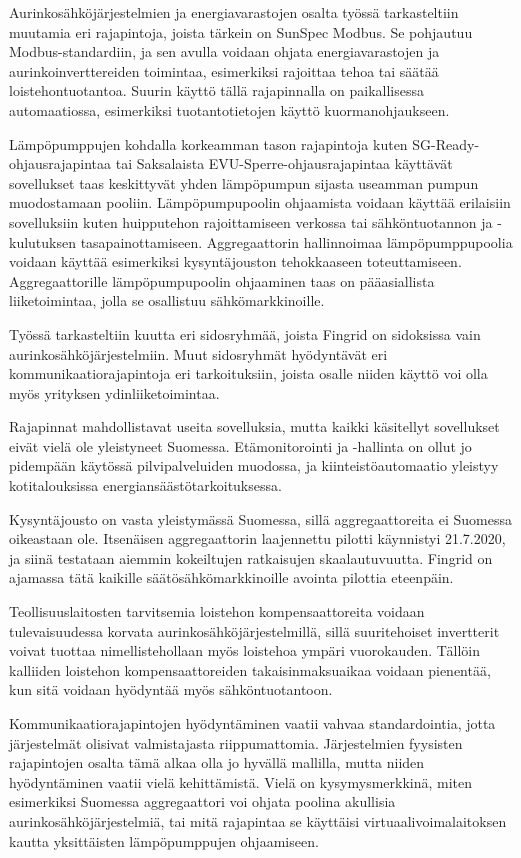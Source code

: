 Aurinkosähköjärjestelmien ja energiavarastojen osalta työssä tarkasteltiin muutamia eri rajapintoja, joista tärkein on SunSpec Modbus. Se pohjautuu Modbus-standardiin, ja sen avulla voidaan ohjata energiavarastojen ja aurinkoinverttereiden toimintaa, esimerkiksi rajoittaa tehoa tai säätää loistehontuotantoa. Suurin käyttö tällä rajapinnalla on paikallisessa automaatiossa, esimerkiksi tuotantotietojen käyttö kuormanohjaukseen.

Lämpöpumppujen kohdalla korkeamman tason rajapintoja kuten SG-Ready-ohjausrajapintaa tai Saksalaista EVU-Sperre-ohjausrajapintaa käyttävät sovellukset taas keskittyvät yhden lämpöpumpun sijasta useamman pumpun muodostamaan pooliin. Lämpöpumpupoolin ohjaamista voidaan käyttää erilaisiin sovelluksiin kuten huipputehon rajoittamiseen verkossa tai sähköntuotannon ja -kulutuksen tasapainottamiseen. Aggregaattorin hallinnoimaa lämpöpumppupoolia voidaan käyttää esimerkiksi kysyntäjouston tehokkaaseen toteuttamiseen. Aggregaattorille lämpöpumpupoolin ohjaaminen taas on pääasiallista liiketoimintaa, jolla se osallistuu sähkömarkkinoille.

Työssä tarkasteltiin kuutta eri sidosryhmää, joista Fingrid on sidoksissa vain aurinkosähköjärjestelmiin. Muut sidosryhmät hyödyntävät eri kommunikaatiorajapintoja eri tarkoituksiin, joista osalle niiden käyttö voi olla myös yrityksen ydinliiketoimintaa.

Rajapinnat mahdollistavat useita sovelluksia, mutta kaikki käsitellyt sovellukset eivät vielä ole yleistyneet Suomessa. Etämonitorointi ja -hallinta on ollut jo pidempään käytössä pilvipalveluiden muodossa, ja kiinteistöautomaatio yleistyy kotitalouksissa energiansäästötarkoituksessa. 

Kysyntäjousto on vasta yleistymässä Suomessa, sillä aggregaattoreita ei Suomessa oikeastaan ole. Itsenäisen aggregaattorin laajennettu pilotti käynnistyi 21.7.2020, ja siinä testataan aiemmin kokeiltujen ratkaisujen skaalautuvuutta. Fingrid on ajamassa tätä kaikille säätösähkömarkkinoille avointa pilottia eteenpäin.

Teollisuuslaitosten tarvitsemia loistehon kompensaattoreita voidaan tulevaisuudessa korvata aurinkosähköjärjestelmillä, sillä suuritehoiset invertterit voivat tuottaa nimellistehollaan myös loistehoa ympäri vuorokauden. Tällöin kalliiden loistehon kompensaattoreiden takaisinmaksuaikaa voidaan pienentää, kun sitä voidaan hyödyntää myös sähköntuotantoon.

Kommunikaatiorajapintojen hyödyntäminen vaatii vahvaa standardointia, jotta järjestelmät olisivat valmistajasta riippumattomia. Järjestelmien fyysisten rajapintojen osalta tämä alkaa olla jo hyvällä mallilla, mutta niiden hyödyntäminen vaatii vielä kehittämistä. Vielä on kysymysmerkkinä, miten esimerkiksi Suomessa aggregaattori voi ohjata poolina akullisia aurinkosähköjärjestelmiä, tai mitä rajapintaa se käyttäisi virtuaalivoimalaitoksen kautta yksittäisten lämpöpumppujen ohjaamiseen.
